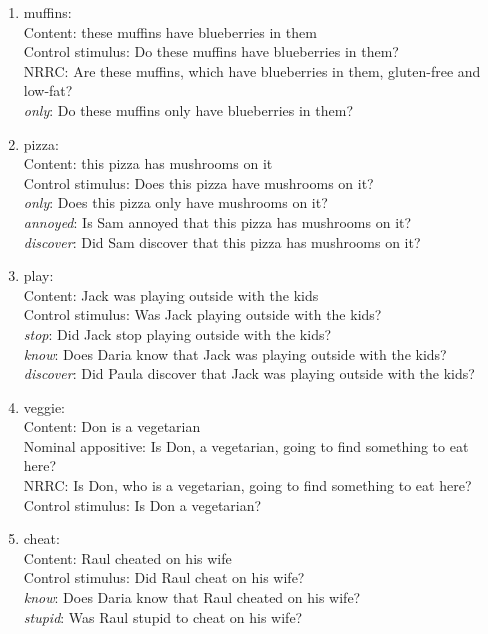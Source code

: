 \documentclass[11pt,fleqn]{article}
\newcommand{\6}{\mbox{$[\hspace*{-.6mm}[$}}
\newcommand{\9}{\mbox{$]\hspace*{-.6mm}]$}}
\begin{document}
\begin{enumerate}

\item  muffins:  \\
     Content: these muffins have blueberries in them\\
     Control stimulus: Do these muffins have blueberries in them?\\
     NRRC: Are these muffins, which have blueberries in them, gluten-free and low-fat?\\
     {\em only}: Do these muffins only have blueberries in them?

\item pizza:  \\
     Content: this pizza has mushrooms on it\\
     Control stimulus: Does this pizza have mushrooms on it?\\
     {\em only}: Does this pizza only have mushrooms on it?\\
     {\em annoyed}: Is Sam annoyed that this pizza has mushrooms on it?\\
     {\em discover}: Did Sam discover that this pizza has mushrooms on it?

\item play:  \\
     Content: Jack was playing outside with the kids\\
     Control stimulus: Was Jack playing outside with the kids?\\
     {\em stop}: Did Jack stop playing outside with the kids?\\
     {\em know}: Does Daria know that Jack was playing outside with the kids?\\
     {\em discover}: Did Paula discover that Jack was playing outside with the kids?

\item veggie:  \\
     Content: Don is a vegetarian\\
     Nominal appositive: Is Don, a vegetarian, going to find something to eat here?\\
     NRRC: Is Don, who is a vegetarian, going to find something to eat here?\\
     Control stimulus: Is Don a vegetarian?

\item cheat:  \\
     Content: Raul cheated on his wife\\
     Control stimulus: Did Raul cheat on his wife?\\
     {\em know}: Does Daria know that Raul cheated on his wife?\\
     {\em stupid}: Was Raul stupid to cheat on his wife?


\end{enumerate}
\end{document}
